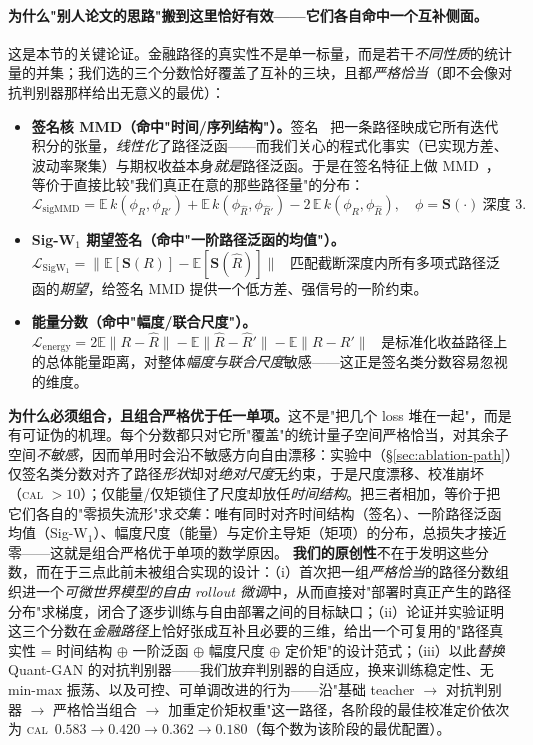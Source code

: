 \documentclass[11pt]{ctexart}
\renewcommand{\cal}{\textsc{cal}}
\newcommand{\E}{\mathbb{E}}
\begin{document}
\paragraph{为什么"别人论文的思路"搬到这里恰好有效——它们各自命中一个互补侧面。}
这是本节的关键论证。金融路径的真实性不是单一标量，而是若干\emph{不同性质}的统计量的并集；我们选的三个分数恰好覆盖了互补的三块，且都\emph{严格恰当}（即不会像对抗判别器那样给出无意义的最优）：
\begin{itemize}\itemsep3pt
\item \textbf{签名核 MMD（命中"时间/序列结构"）。}签名~\citep{lyons2007differential} 把一条路径映成它所有迭代积分的张量，\emph{线性化}了路径泛函——而我们关心的程式化事实（已实现方差、波动率聚集）与期权收益本身\emph{就是}路径泛函。于是在签名特征上做 MMD~\citep{gretton2012kernel,salvi2021signature,issa2023nonadversarial}，等价于直接比较"我们真正在意的那些路径量"的分布：
\begin{equation}
\mathcal L_{\mathrm{sigMMD}}
= \E\,k(\phi_R,\phi_{R'}) + \E\,k(\phi_{\hat R},\phi_{\hat R'})
- 2\,\E\,k(\phi_R,\phi_{\hat R}),\quad \phi=\mathbf S(\cdot)\ \text{深度 }3.
\end{equation}
\item \textbf{Sig-W$_1$ 期望签名（命中"一阶路径泛函的均值"）。}$\mathcal L_{\mathrm{SigW_1}}=\|\E[\mathbf S(R)]-\E[\mathbf S(\hat R)]\|$~\citep{ni2021sigwgan,ni2020conditional} 匹配截断深度内所有多项式路径泛函的\emph{期望}，给签名 MMD 提供一个低方差、强信号的一阶约束。
\item \textbf{能量分数（命中"幅度/联合尺度"）。}$\mathcal L_{\mathrm{energy}}=2\E\|R-\hat R\|-\E\|\hat R-\hat R'\|-\E\|R-R'\|$~\citep{pacchiardi2024probabilistic} 是标准化收益路径上的总体能量距离，对整体\emph{幅度与联合尺度}敏感——这正是签名类分数容易忽视的维度。
\end{itemize}
\textbf{为什么必须组合，且组合严格优于任一单项。}这不是"把几个 loss 堆在一起"，而是有可证伪的机理。每个分数都只对它所"覆盖"的统计量子空间严格恰当，对其余子空间\emph{不敏感}，因而单用时会沿不敏感方向自由漂移：实验中（\S\ref{sec:ablation-path}）仅签名类分数对齐了路径\emph{形状}却对\emph{绝对尺度}无约束，于是尺度漂移、校准崩坏（\cal{} $>10$）；仅能量/仅矩锁住了尺度却放任\emph{时间结构}。把三者相加，等价于把它们各自的"零损失流形"求\emph{交集}：唯有同时对齐时间结构（签名）、一阶路径泛函均值（Sig-W$_1$）、幅度尺度（能量）与定价主导矩（矩项）的分布，总损失才接近零——这就是组合严格优于单项的数学原因。
\textbf{我们的原创性}不在于发明这些分数，而在于三点此前未被组合实现的设计：（i）首次把一组\emph{严格恰当}的路径分数组织进一个\emph{可微世界模型的自由 rollout 微调}中，从而直接对"部署时真正产生的路径分布"求梯度，闭合了逐步训练与自由部署之间的目标缺口；（ii）论证并实验证明这三个分数在\emph{金融路径}上恰好张成互补且必要的三维，给出一个可复用的"路径真实性 = 时间结构 $\oplus$ 一阶泛函 $\oplus$ 幅度尺度 $\oplus$ 定价矩"的设计范式；（iii）以此\emph{替换} Quant-GAN 的对抗判别器——我们放弃判别器的自适应，换来训练稳定性、无 min-max 振荡、以及可控、可单调改进的行为——沿"基础 teacher $\to$ 对抗判别器 $\to$ 严格恰当组合 $\to$ 加重定价矩权重"这一路径，各阶段的最佳校准定价依次为 \cal{}~$0.583\!\to\!0.420\!\to\!0.362\!\to\!0.180$（每个数为该阶段的最优配置）。
\end{document}
